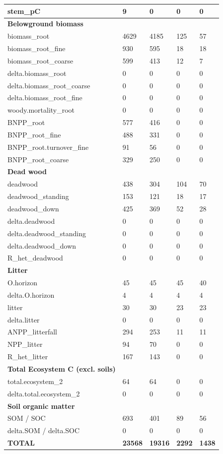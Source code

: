\documentclass[, manuscript]{copernicus}
\begin{document}
\begin{longtable}[t]{l|l|l|l|l}
\hline
stem\_pC & 9 & 0 & 0 & 0\\
\hline
\textbf{Belowground biomass} & \textbf{} & \textbf{} & \textbf{} & \textbf{}\\
\hline
biomass\_root & 4629 & 4185 & 125 & 57\\
\hline
biomass\_root\_fine & 930 & 595 & 18 & 18\\
\hline
biomass\_root\_coarse & 599 & 413 & 12 & 7\\
\hline
delta.biomass\_root & 0 & 0 & 0 & 0\\
\hline
delta.biomass\_root\_coarse & 0 & 0 & 0 & 0\\
\hline
delta.biomass\_root\_fine & 0 & 0 & 0 & 0\\
\hline
woody.mortality\_root & 0 & 0 & 0 & 0\\
\hline
BNPP\_root & 577 & 416 & 0 & 0\\
\hline
BNPP\_root\_fine & 488 & 331 & 0 & 0\\
\hline
BNPP\_root.turnover\_fine & 91 & 56 & 0 & 0\\
\hline
BNPP\_root\_coarse & 329 & 250 & 0 & 0\\
\hline
\textbf{Dead wood} & \textbf{} & \textbf{} & \textbf{} & \textbf{}\\
\hline
deadwood & 438 & 304 & 104 & 70\\
\hline
deadwood\_standing & 153 & 121 & 18 & 17\\
\hline
deadwood\_down & 425 & 369 & 52 & 28\\
\hline
delta.deadwood & 0 & 0 & 0 & 0\\
\hline
delta.deadwood\_standing & 0 & 0 & 0 & 0\\
\hline
delta.deadwood\_down & 0 & 0 & 0 & 0\\
\hline
R\_het\_deadwood & 0 & 0 & 0 & 0\\
\hline
\textbf{Litter} & \textbf{} & \textbf{} & \textbf{} & \textbf{}\\
\hline
O.horizon & 45 & 45 & 45 & 40\\
\hline
delta.O.horizon & 4 & 4 & 4 & 4\\
\hline
litter & 30 & 30 & 23 & 23\\
\hline
delta.litter & 0 & 0 & 0 & 0\\
\hline
ANPP\_litterfall & 294 & 253 & 11 & 11\\
\hline
NPP\_litter & 94 & 70 & 0 & 0\\
\hline
R\_het\_litter & 167 & 143 & 0 & 0\\
\hline
\textbf{Total Ecosystem C (excl. soils)} & \textbf{} & \textbf{} & \textbf{} & \textbf{}\\
\hline
total.ecosystem\_2 & 64 & 64 & 0 & 0\\
\hline
delta.total.ecosystem\_2 & 0 & 0 & 0 & 0\\
\hline
\textbf{Soil organic matter} & \textbf{} & \textbf{} & \textbf{} & \textbf{}\\
\hline
SOM / SOC & 693 & 401 & 89 & 56\\
\hline
delta.SOM / delta.SOC & 0 & 0 & 0 & 0\\
\hline
\textbf{TOTAL} & \textbf{23568} & \textbf{19316} & \textbf{2292} & \textbf{1438}\\
\hline
\end{longtable}
\end{document}
